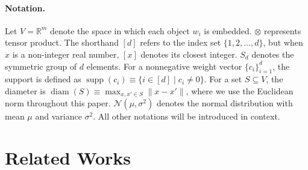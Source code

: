 \documentclass{article}
\theoremstyle{plain}
\newcommand{\supp}{\operatorname{supp}}
\def\REV#1{{\color[HTML]{000000}#1}}
\begin{document}





\vspace{-2mm}
\paragraph{Notation.}

Let $V = \mathbb{R}^m$ denote the space in which each object $w_i$ is embedded. $\otimes$ represents tensor product. The shorthand $[d]$ refers to the index set $\{1,2,\dots,d\}$, but when $x$ is a non-integer real number, $[x]$ denotes its closest integer. $S_d$ denotes the symmetric group of $d$ elements. For a nonnegative weight vector $\{c_i\}_{i=1}^d$, the support is defined as $\supp(c_i) \equiv \{ i \in [d] \mid c_i \neq 0 \}$. For a set $S \subseteq V$, the diameter is $\operatorname{diam}(S) \equiv \max_{x,x'\in S} \|x-x'\|$, where we use the Euclidean norm throughout this paper. $\mathcal{N}(\mu, \sigma^2)$ denotes the normal distribution with mean $\mu$ and variance $\sigma^2$. All other notations will be introduced in context. 



\vspace{-2mm}
\section{Related Works}\label{sec: related works}
\vspace{-1mm}

\end{document}
